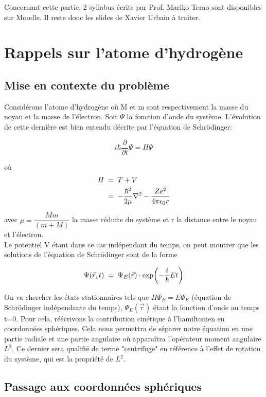 Concernant cette partie, 2 syllabus écrits par Prof. Mariko Terao sont disponibles sur Moodle. Il reste donc les slides de Xavier Urbain à traiter.

\section{Rappels sur l'atome d'hydrogène}

\subsection{Mise en contexte du problème}

Considérons l'atome d'hydrogène où M et m sont respectivement la masse du noyau et la masse de l'électron. Soit $\Psi$ la fonction d'onde du système. L'évolution de cette dernière est bien entendu décrite par l'équation de Schrödinger:

$$i\hbar \dfrac{\partial}{\partial t}\Psi=H\Psi$$

où \begin{align}
H&\; = \; T+V \\
&\; = \; -\dfrac{\hbar^2}{2\mu}\nabla^2-\dfrac{Ze^2}{4\pi \epsilon_0 r}
\end{align}

avec $\mu=\dfrac{Mm}{(m+M)}$ la masse réduite du système et r la distance entre le noyau et l'électron. \\

Le potentiel V étant dans ce cas indépendant du temps, on peut montrer que les solutions de l'équation de Schrödinger sont de la forme

\begin{equation*}
    \Psi(\Vec{r},t) \; = \; \Psi_E(\Vec{r}) \cdot \exp(-\dfrac{i}{\hbar}Et)
\end{equation*}

\vspace{0.2cm}

On va chercher les états stationnaires tels que $H\Psi_E=E\Psi_E$ (équation de Schrödinger indépendante du temps), $\Psi_E(\Vec{r})$ étant la fonction d'onde au temps t=0. Pour cela, réécrivons la contribution cinétique à l'hamiltonien en coordonnées sphériques. Cela nous permettra de séparer notre équation en une partie radiale et une partie angulaire où apparaîtra l'opérateur moment angulaire $L^2$. Ce dernier sera qualifié de terme "centrifuge" en référence à l'effet de rotation du système, qui est la propriété de $L^2$. 

\subsection{Passage aux coordonnées sphériques}

